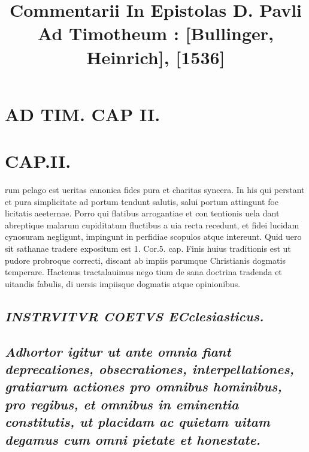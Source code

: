 \documentclass{article}
\begin{document}
\date{}
        \title{Commentarii In Epistolas D. Pavli Ad Timotheum : [Bullinger, Heinrich], [1536]}
\maketitle
\tableofcontents
\clearpage
\begin{pages} 
\beginnumbering
        
\section*{AD TIM. CAP II. }
\marginpar{[ p.107 ]}
\section{CAP.II.}\pstart rum pelago est ueritas canonica fides pura et charitas syncera. In his qui perstant et pura simplicitate ad portum tendunt salutis, salui portum attingunt foe licitatis aeeternae. Porro qui flatibus arrogantiae et con tentionis uela dant abreptique malarum cupiditatum fluctibus a uia recta recedunt, et fidei lucidam cynosuram negligunt, impingunt in perfidiae scopulos atque intereunt. Quid uero sit sathanae tradere expositum est 1. Cor.5. cap. Finis huius traditionis est ut pudore probroque correcti, discant ab impiis parumque Christianis dogmatis temperare. Hactenus tractalauimus nego tium de sana doctrina tradenda et uitandis fabulis, di uersis impiisque dogmatis atque opinionibus.  \pend
{}
{}
\subsection*{\textit{INSTRVITVR COETVS ECclesiasticus. }}
{}
\subsection*{\textit{Adhortor igitur ut ante omnia fiant deprecationes, obsecrationes, interpellationes, gratiarum actiones pro omnibus hominibus, pro regibus, et omnibus in eminentia constitutis, ut placidam ac quietam uitam degamus cum omni pietate et honestate. }}

\end{pages}
\end{document}
